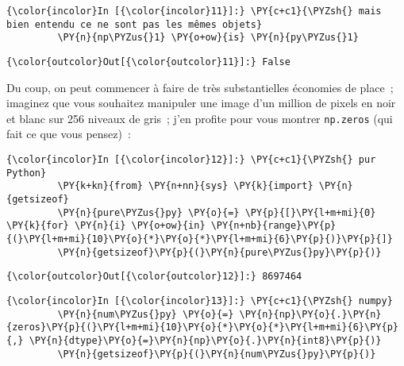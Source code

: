     \begin{Verbatim}[commandchars=\\\{\},frame=single,framerule=0.3mm,rulecolor=\color{cellframecolor}]
{\color{incolor}In [{\color{incolor}11}]:} \PY{c+c1}{\PYZsh{} mais bien entendu ce ne sont pas les mêmes objets}
         \PY{n}{np\PYZus{}1} \PY{o+ow}{is} \PY{n}{py\PYZus{}1}
\end{Verbatim}


\begin{Verbatim}[commandchars=\\\{\},frame=single,framerule=0.3mm,rulecolor=\color{cellframecolor}]
{\color{outcolor}Out[{\color{outcolor}11}]:} False
\end{Verbatim}
            
    Du coup, on peut commencer à faire de très substantielles économies de
place~; imaginez que vous souhaitez manipuler une image d'un million de
pixels en noir et blanc sur 256 niveaux de gris~; j'en profite pour vous
montrer \texttt{np.zeros} (qui fait ce que vous pensez)~:

    \begin{Verbatim}[commandchars=\\\{\},frame=single,framerule=0.3mm,rulecolor=\color{cellframecolor}]
{\color{incolor}In [{\color{incolor}12}]:} \PY{c+c1}{\PYZsh{} pur Python}
         \PY{k+kn}{from} \PY{n+nn}{sys} \PY{k}{import} \PY{n}{getsizeof}
         \PY{n}{pure\PYZus{}py} \PY{o}{=} \PY{p}{[}\PY{l+m+mi}{0} \PY{k}{for} \PY{n}{i} \PY{o+ow}{in} \PY{n+nb}{range}\PY{p}{(}\PY{l+m+mi}{10}\PY{o}{*}\PY{o}{*}\PY{l+m+mi}{6}\PY{p}{)}\PY{p}{]}
         \PY{n}{getsizeof}\PY{p}{(}\PY{n}{pure\PYZus{}py}\PY{p}{)}
\end{Verbatim}


\begin{Verbatim}[commandchars=\\\{\},frame=single,framerule=0.3mm,rulecolor=\color{cellframecolor}]
{\color{outcolor}Out[{\color{outcolor}12}]:} 8697464
\end{Verbatim}
            
    \begin{Verbatim}[commandchars=\\\{\},frame=single,framerule=0.3mm,rulecolor=\color{cellframecolor}]
{\color{incolor}In [{\color{incolor}13}]:} \PY{c+c1}{\PYZsh{} numpy}
         \PY{n}{num\PYZus{}py} \PY{o}{=} \PY{n}{np}\PY{o}{.}\PY{n}{zeros}\PY{p}{(}\PY{l+m+mi}{10}\PY{o}{*}\PY{o}{*}\PY{l+m+mi}{6}\PY{p}{,} \PY{n}{dtype}\PY{o}{=}\PY{n}{np}\PY{o}{.}\PY{n}{int8}\PY{p}{)}
         \PY{n}{getsizeof}\PY{p}{(}\PY{n}{num\PYZus{}py}\PY{p}{)}
\end{Verbatim}


